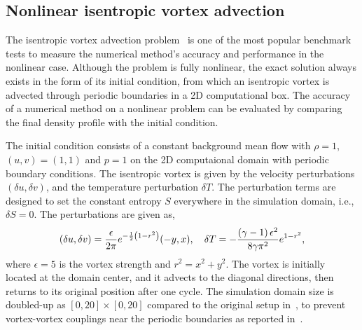 \subsection{Nonlinear isentropic vortex advection}\label{subsec:vortex_weno}

The isentropic vortex advection problem~\cite{shu1998essentially} is one of the most popular benchmark tests
to measure the numerical method's accuracy and performance in the nonlinear case.
Although the problem is fully nonlinear, the exact solution always exists
in the form of its initial condition,
from which an isentropic vortex is advected through periodic boundaries in a 2D computational box.
The accuracy of a numerical method on a nonlinear problem
can be evaluated by comparing the final density profile with the initial condition.

The initial condition consists of a constant background mean flow with \( \rho = 1 \),
\( (u, v) = (1,1) \) and \( p =1 \) on the 2D computaional domain
with periodic boundary conditions.
The isentropic vortex is given by the velocity perturbations \( (\delta u, \delta v) \),
and the temperature perturbation \( \delta T \).
The perturbation terms are designed to set the constant entropy \( S \)
everywhere in the simulation domain, i.e., \( \delta S = 0 \).
The perturbations are given as,
\begin{equation}\label{eq:isentropic_vortex_initial}
    \left( \delta u, \delta v \right) = \frac{\epsilon}{2 \pi} e^{-\frac{1}{2} \left( 1 - r^{2} \right)} (-y, x), \quad
    \delta T = - \frac{\left( \gamma - 1 \right) \epsilon^{2}}{8 \gamma \pi^{2}} e^{1 - r^{2}},
\end{equation}
where \( \epsilon = 5 \) is the vortex strength and \( r^{2} = x^{2} + y^{2} \).
The vortex is initially located at the domain center,
and it advects to the diagonal directions, then returns to its original position after one cycle.
The simulation domain size is doubled-up as \( [0, 20] \times [0, 20] \)
compared to the original setup in~\cite{shu1998essentially},
to prevent vortex-vortex couplings near the periodic boundaries
as reported in~\cite{spiegel2015survey}.

